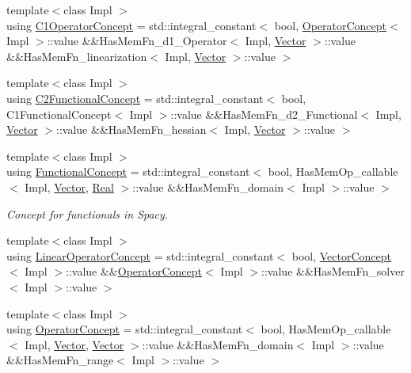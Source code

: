 \begin{DoxyCompactItemize}
\item 
{\footnotesize template$<$class Impl $>$ }\\using \hyperlink{group__ConceptGroup_ga61ea9fe1d23e9f45e4e5fe940fe0e0cb}{C1\+Operator\+Concept} = std\+::integral\+\_\+constant$<$ bool, \hyperlink{group__ConceptGroup_ga0cd6ba53feff75abbb6822b45fd6265e}{Operator\+Concept}$<$ Impl $>$\+::value \&\&Has\+Mem\+Fn\+\_\+d1\+\_\+\+Operator$<$ Impl, \hyperlink{classSpacy_1_1Vector}{Vector} $>$\+::value \&\&Has\+Mem\+Fn\+\_\+linearization$<$ Impl, \hyperlink{classSpacy_1_1Vector}{Vector} $>$\+::value $>$
\item 
{\footnotesize template$<$class Impl $>$ }\\using \hyperlink{group__ConceptGroup_ga265f0821ce6e0688d6e9abb8d8e0af6a}{C2\+Functional\+Concept} = std\+::integral\+\_\+constant$<$ bool, C1\+Functional\+Concept$<$ Impl $>$\+::value \&\&Has\+Mem\+Fn\+\_\+d2\+\_\+\+Functional$<$ Impl, \hyperlink{classSpacy_1_1Vector}{Vector} $>$\+::value \&\&Has\+Mem\+Fn\+\_\+hessian$<$ Impl, \hyperlink{classSpacy_1_1Vector}{Vector} $>$\+::value $>$
\item 
{\footnotesize template$<$class Impl $>$ }\\using \hyperlink{group__ConceptGroup_gae45328d2e01ef6c8e5d948b69fda385f}{Functional\+Concept} = std\+::integral\+\_\+constant$<$ bool, Has\+Mem\+Op\+\_\+callable$<$ Impl, \hyperlink{classSpacy_1_1Vector}{Vector}, \hyperlink{classSpacy_1_1Real}{Real} $>$\+::value \&\&Has\+Mem\+Fn\+\_\+domain$<$ Impl $>$\+::value $>$
\begin{DoxyCompactList}\small\item\em Concept for functionals in Spacy. \end{DoxyCompactList}\item 
{\footnotesize template$<$class Impl $>$ }\\using \hyperlink{group__ConceptGroup_ga8d3bdfc9abd844ab446a31fcd3f8ef8c}{Linear\+Operator\+Concept} = std\+::integral\+\_\+constant$<$ bool, \hyperlink{group__ConceptGroup_gac8fbeed0f838941e90ebe635a546e1db}{Vector\+Concept}$<$ Impl $>$\+::value \&\&\hyperlink{group__ConceptGroup_ga0cd6ba53feff75abbb6822b45fd6265e}{Operator\+Concept}$<$ Impl $>$\+::value \&\&Has\+Mem\+Fn\+\_\+solver$<$ Impl $>$\+::value $>$
\item 
{\footnotesize template$<$class Impl $>$ }\\using \hyperlink{group__ConceptGroup_ga0cd6ba53feff75abbb6822b45fd6265e}{Operator\+Concept} = std\+::integral\+\_\+constant$<$ bool, Has\+Mem\+Op\+\_\+callable$<$ Impl, \hyperlink{classSpacy_1_1Vector}{Vector}, \hyperlink{classSpacy_1_1Vector}{Vector} $>$\+::value \&\&Has\+Mem\+Fn\+\_\+domain$<$ Impl $>$\+::value \&\&Has\+Mem\+Fn\+\_\+range$<$ Impl $>$\+::value $>$

\end{DoxyCompactItemize}
